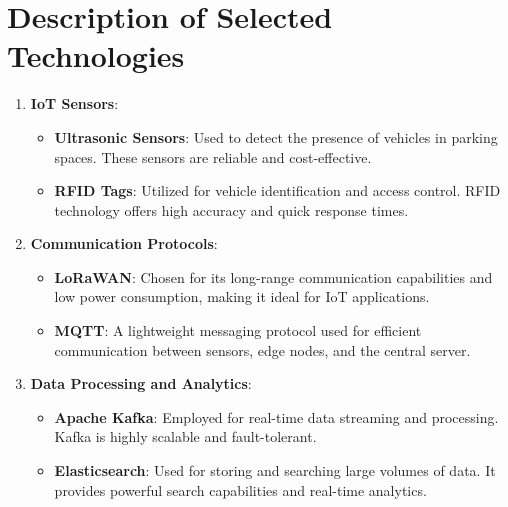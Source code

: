 \documentclass[oneside, 12pt, a4paper, draft]{book}
\begin{document}
\section{Description of Selected Technologies}
\label{sec:org161455d}
\begin{enumerate}
\item \textbf{\textbf{IoT Sensors}}:
\begin{itemize}
\item \textbf{\textbf{Ultrasonic Sensors}}: Used to detect the presence of vehicles in parking spaces. These sensors are reliable and cost-effective.
\item \textbf{\textbf{RFID Tags}}: Utilized for vehicle identification and access control. RFID technology offers high accuracy and quick response times.
\end{itemize}

\item \textbf{\textbf{Communication Protocols}}:
\begin{itemize}
\item \textbf{\textbf{LoRaWAN}}: Chosen for its long-range communication capabilities and low power consumption, making it ideal for IoT applications.
\item \textbf{\textbf{MQTT}}: A lightweight messaging protocol used for efficient communication between sensors, edge nodes, and the central server.
\end{itemize}

\item \textbf{\textbf{Data Processing and Analytics}}:
\begin{itemize}
\item \textbf{\textbf{Apache Kafka}}: Employed for real-time data streaming and processing. Kafka is highly scalable and fault-tolerant.
\item \textbf{\textbf{Elasticsearch}}: Used for storing and searching large volumes of data. It provides powerful search capabilities and real-time analytics.
\end{itemize}
\end{enumerate}
\end{document}
